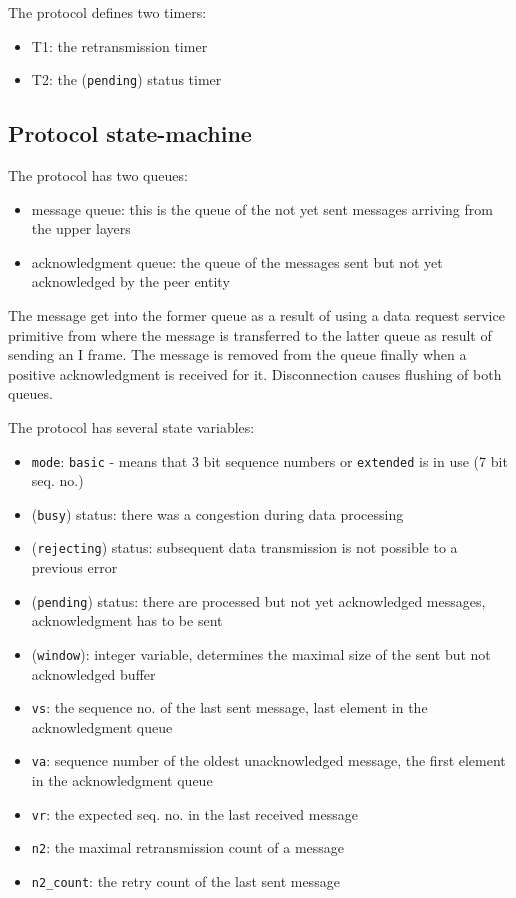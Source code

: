\documentclass[a4paper]{article}
\begin{document}
The protocol defines two timers:
\begin{itemize}
    \item T1: the retransmission timer
    \item T2: the (\verb!pending!) status timer
\end{itemize}

\subsection{Protocol state-machine}

The protocol has two queues:
\begin{itemize}
    \item message queue: this is the queue of the not yet sent messages arriving from the upper layers
    \item acknowledgment queue: the queue of the messages sent but not yet acknowledged by the peer entity
\end{itemize}

The message get into the former queue as a result of using a data request service primitive from where the message is
transferred to the latter queue as result of sending an I frame. The message is removed from the queue finally when a
positive acknowledgment is received for it. Disconnection causes flushing of both queues.

The protocol has several state variables:
\begin{itemize}
    \item \verb!mode!: \verb!basic! - means that 3 bit sequence numbers or
          \verb!extended! is in use (7 bit seq. no.)
    \item (\verb!busy!) status: there was a congestion during data processing
    \item (\verb!rejecting!) status: subsequent data transmission is not possible to a previous error
    \item (\verb!pending!) status: there are processed but not yet acknowledged messages, acknowledgment has to
          be sent
    \item (\verb!window!): integer variable, determines the maximal size of the sent but not acknowledged
          buffer
    \item \verb!vs!: the sequence no. of the last sent message, last element in the acknowledgment queue
    \item \verb!va!: sequence number of the oldest unacknowledged message, the first element in the
          acknowledgment queue
    \item \verb!vr!: the expected seq. no. in the last received message
    \item \verb!n2!: the maximal retransmission count of a message
    \item \verb!n2_count!: the retry count of the last sent message
\end{itemize}
\end{document}
